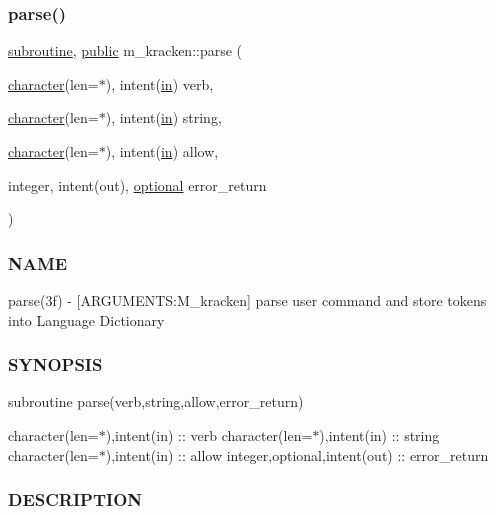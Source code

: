 \subsubsection{\texorpdfstring{parse()}{parse()}}
{\footnotesize\ttfamily \hyperlink{M__stopwatch_83_8txt_acfbcff50169d691ff02d4a123ed70482}{subroutine}, \hyperlink{M__stopwatch_83_8txt_a2f74811300c361e53b430611a7d1769f}{public} m\+\_\+kracken\+::parse (\begin{DoxyParamCaption}\item[{\hyperlink{option__stopwatch_83_8txt_abd4b21fbbd175834027b5224bfe97e66}{character}(len=$\ast$), intent(\hyperlink{M__journal_83_8txt_afce72651d1eed785a2132bee863b2f38}{in})}]{verb,  }\item[{\hyperlink{option__stopwatch_83_8txt_abd4b21fbbd175834027b5224bfe97e66}{character}(len=$\ast$), intent(\hyperlink{M__journal_83_8txt_afce72651d1eed785a2132bee863b2f38}{in})}]{string,  }\item[{\hyperlink{option__stopwatch_83_8txt_abd4b21fbbd175834027b5224bfe97e66}{character}(len=$\ast$), intent(\hyperlink{M__journal_83_8txt_afce72651d1eed785a2132bee863b2f38}{in})}]{allow,  }\item[{integer, intent(out), \hyperlink{option__stopwatch_83_8txt_aa4ece75e7acf58a4843f70fe18c3ade5}{optional}}]{error\+\_\+return }\end{DoxyParamCaption})}



\subsubsection*{N\+A\+ME}

parse(3f) -\/ \mbox{[}A\+R\+G\+U\+M\+E\+N\+TS\+:M\+\_\+kracken\mbox{]} parse user command and store tokens into Language Dictionary 

\subsubsection*{S\+Y\+N\+O\+P\+S\+IS}

subroutine parse(verb,string,allow,error\+\_\+return)

character(len=$\ast$),intent(in) \+:\+: verb character(len=$\ast$),intent(in) \+:\+: string character(len=$\ast$),intent(in) \+:\+: allow integer,optional,intent(out) \+:\+: error\+\_\+return

\subsubsection*{D\+E\+S\+C\+R\+I\+P\+T\+I\+ON}

